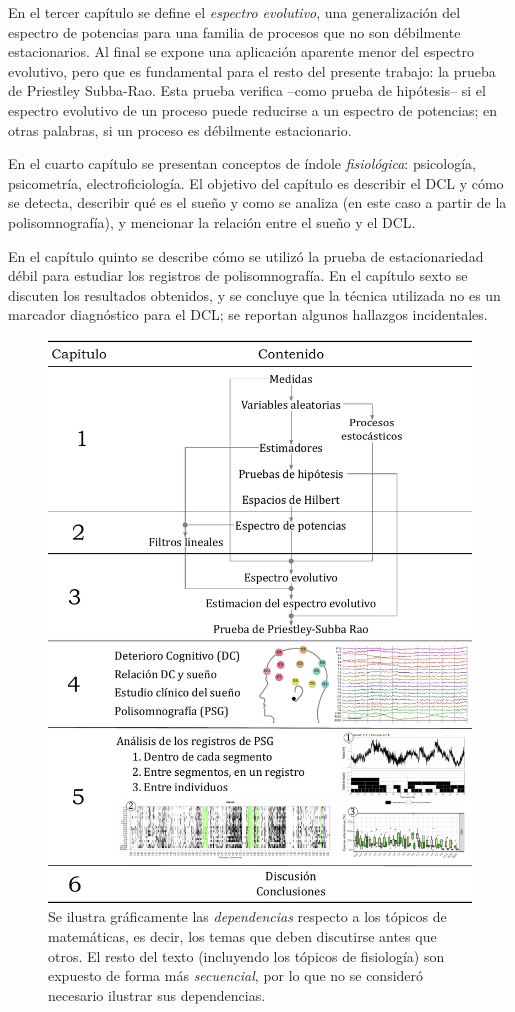 En el tercer capítulo se define el \textit{espectro evolutivo}, una generalización del espectro de potencias para una familia de procesos que no son débilmente estacionarios.
%
Al final se expone una aplicación aparente menor del espectro evolutivo, pero que es fundamental para el resto del presente trabajo: la prueba de Priestley Subba-Rao. 
%
Esta prueba verifica --como prueba de hipótesis-- si el espectro evolutivo de un proceso puede reducirse a un espectro de potencias; en otras palabras, si un proceso es débilmente estacionario.

En el cuarto capítulo se presentan conceptos de índole \textit{fisiológica}: psicología, psicometría, electroficiología.
%
El objetivo del capítulo es describir el DCL y cómo se detecta, describir qué es el sueño y como se analiza (en este caso a partir de la polisomnografía), y mencionar la relación entre el sueño y el DCL.

En el capítulo quinto se describe cómo se utilizó la prueba de estacionariedad débil para estudiar los registros de polisomnografía.
%
En el capítulo sexto se discuten los resultados obtenidos, y se concluye que la técnica utilizada no es un marcador diagnóstico para el DCL; se reportan algunos hallazgos incidentales.

\begin{figure}
\centering
\includegraphics[width=.9\textwidth]{./estructura_texto_v2.pdf}
\caption[Estructura de la tesis]{Se ilustra gráficamente las \textit{dependencias} respecto a los tópicos de matemáticas, es decir, los temas que deben discutirse antes que otros. El resto del texto (incluyendo los tópicos de fisiología) son expuesto de forma más \textit{secuencial}, por lo que no se consideró necesario ilustrar sus dependencias.}
\label{intro:estructura}
\end{figure}

